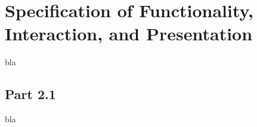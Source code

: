 \section{Specification of Functionality, Interaction, and Presentation }
bla
\subsection{Part 2.1}
bla
